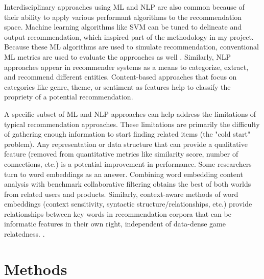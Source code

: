 \documentclass[10pt,twocolumn]{article}
\begin{document}
Interdisciplinary approaches using ML and NLP are also common because of their ability to apply various performant algorithms to the recommendation space. Machine learning algorithms like SVM can be tuned to delineate and output recommendation, which inspired part of the methodology in my project. \cite{XuAraki} Because these ML algorithms are used to simulate recommendation, conventional ML metrics are used to evaluate the approaches as well \cite{Nawrocka, Chowdhury, Sujatha}. Similarly, NLP approaches appear in recommender systems as a means to categorize, extract, and recommend different entities. Content-based approaches that focus on categories like genre, theme, or sentiment as features help to classify the propriety of a potential recommendation. \cite{Berbatova, Asani}

A specific subset of ML and NLP approaches can help address the limitations of typical recommendation approaches. These limitations are primarily the difficulty of gathering enough information to start finding related items (the "cold start" problem). Any representation or data structure that can provide a qualitative feature (removed from quantitative metrics like similarity score, number of connections, etc.) is a potential improvement in performance. Some researchers turn to word embeddings as an answer. Combining word embedding content analysis with benchmark collaborative filtering obtains the best of both worlds from related users and products. \cite{LNguyen} Similarly, context-aware methods of word embeddings (context sensitivity, syntactic structure/relationships, etc.) provide relationships between key words in recommendation corpora that can be informatic features in their own right, independent of data-dense game relatedness. \cite{CSundermann, Ramzan}.

\section{Methods}


\end{document}

